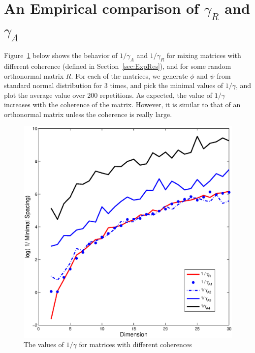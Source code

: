 \onecolumn
\appendix
\section{An Empirical comparison of $\gamma_R$ and $\gamma_A$}
\label{sec:gamma}

Figure~\ref{fig:miniSpacing} below shows the behavior of $1/\gamma_A$ and $1/\gamma_R$ for mixing matrices with different coherence (defined in Section~\ref{sec:ExpRes}), and for some random orthonormal matrix $R$. For each of the matrices, we generate $\phi$ and $\psi$ from standard normal distribution for 3 times, and pick the minimal values of $1/\gamma$, and plot the average value over 200 repetitions. %
As expected, the value of $1/\gamma$ increases with the coherence of the matrix. However, it is similar to that of an orthonormal matrix unless the coherence is really large. 
\begin{figure}[h]
\centering
	\includegraphics[width = 0.75\columnwidth]{miniSpacing}
\vspace{-0.4cm}
\caption{
\label{fig:miniSpacing}
 The values of $1/\gamma$ for matrices with different coherences}
\vspace{-0.5cm}
\end{figure}

